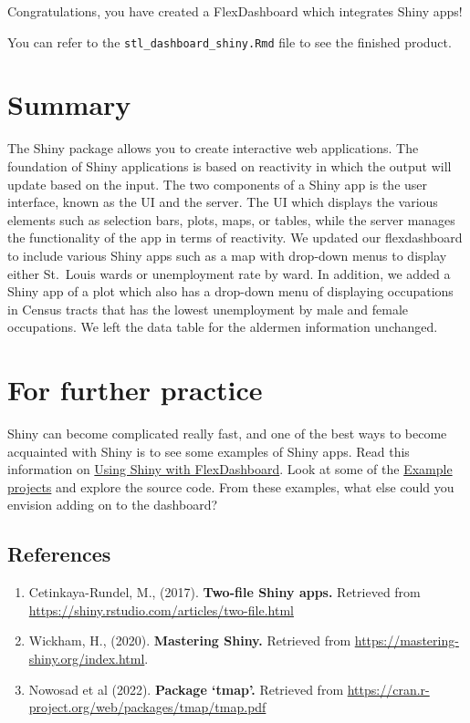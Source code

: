 \documentclass[
  krantz2]{krantz}
\begin{document}
Congratulations, you have created a FlexDashboard which integrates Shiny apps!

You can refer to the \texttt{stl\_dashboard\_shiny.Rmd} file to see the finished product.

\hypertarget{shiny-summary}{%
\chapter{Summary}\label{shiny-summary}}

The Shiny package allows you to create interactive web applications. The foundation of Shiny applications is based on reactivity in which the output will update based on the input. The two components of a Shiny app is the user interface, known as the UI and the server. The UI which displays the various elements such as selection bars, plots, maps, or tables, while the server manages the functionality of the app in terms of reactivity. We updated our flexdashboard to include various Shiny apps such as a map with drop-down menus to display either St.~Louis wards or unemployment rate by ward. In addition, we added a Shiny app of a plot which also has a drop-down menu of displaying occupations in Census tracts that has the lowest unemployment by male and female occupations. We left the data table for the aldermen information unchanged.

\hypertarget{shiny-study}{%
\chapter{For further practice}\label{shiny-study}}

Shiny can become complicated really fast, and one of the best ways to become acquainted with Shiny is to see some examples of Shiny apps. Read this information on \href{https://rstudio.github.io/flexdashboard/articles/shiny.html}{Using Shiny with FlexDashboard}. Look at some of the \href{https://rstudio.github.io/flexdashboard/articles/examples.html}{Example projects} and explore the source code. From these examples, what else could you envision adding on to the dashboard?

\hypertarget{shiny-resources}{%
\section{References}\label{shiny-resources}}

\begin{enumerate}
\def\labelenumi{\arabic{enumi}.}
\item
  Cetinkaya-Rundel, M., (2017). \textbf{Two-file Shiny apps.} Retrieved from \url{https://shiny.rstudio.com/articles/two-file.html}
\item
  Wickham, H., (2020). \textbf{Mastering Shiny.} Retrieved from \url{https://mastering-shiny.org/index.html}.
\item
  Nowosad et al (2022). \textbf{Package `tmap'.} Retrieved from \url{https://cran.r-project.org/web/packages/tmap/tmap.pdf}
\end{enumerate}
\end{document}
